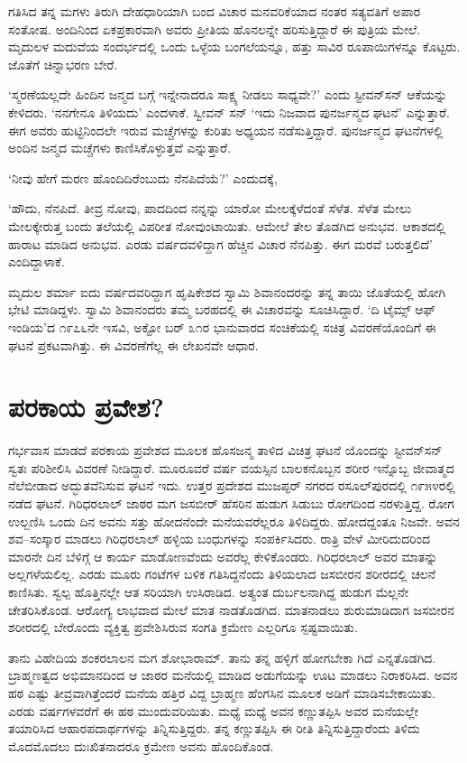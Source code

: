 ಗತಿಸಿದ ತನ್ನ ಮಗಳು ತಿರುಗಿ ದೇಹಧಾರಿಯಾಗಿ ಬಂದ ವಿಚಾರ ಮನವರಿಕೆಯಾದ ನಂತರ ಸತ್ಯವತಿಗೆ ಅಪಾರ ಸಂತೋಷ. ಅಂದಿನಿಂದ ಏಕಪ್ರಕಾರವಾಗಿ ಅವರು ಪ್ರೀತಿಯ ಹೊನಲನ್ನೇ ಹರಿಸುತ್ತಿದ್ದಾರೆ ಈ ಪುತ್ರಿಯ ಮೇಲೆ. ಮೃದುಲಳ ಮದುವೆಯ ಸಂದರ್ಭದಲ್ಲಿ ಒಂದು ಒಳ್ಳೆಯ ಬಂಗಲೆಯನ್ನೂ, ಹತ್ತು ಸಾವಿರ ರೂಪಾಯಿಗಳನ್ನೂ ಕೊಟ್ಟರು. ಜೊತೆಗೆ ಚಿನ್ನಾಭರಣ ಬೇರೆ.

‘ಸ್ಮರಣೆಯಲ್ಲದೇ ಹಿಂದಿನ ಜನ್ಮದ ಬಗ್ಗೆ ಇನ್ನೇನಾದರೂ ಸಾಕ್ಷ್ಯ ನೀಡಲು ಸಾಧ್ಯವೇ?’ ಎಂದು ಸ್ಟೀವನ್​ಸನ್ ಆಕೆಯನ್ನು ಕೇಳಿದರು. ‘ನನಗೇನೂ ತಿಳಿಯದು’ ಎಂದಳಾಕೆ. ಸ್ವೀವನ್ ಸನ್ ‘ಇದು ನಿಜವಾದ ಪುನರ್ಜನ್ಮದ ಘಟನೆ’ ಎನ್ನುತ್ತಾರೆ. ಈಗ ಅವರು ಹುಟ್ಟಿನಿಂದಲೇ ಇರುವ ಮಚ್ಚೆಗಳನ್ನು ಕುರಿತು ಅಧ್ಯಯನ ನಡೆಸುತ್ತಿದ್ದಾರೆ. ಪುನರ್ಜನ್ಮದ ಘಟನೆಗಳಲ್ಲಿ ಅಂದಿನ ಜನ್ಮದ ಮಚ್ಚೆಗಳು ಕಾಣಿಸಿಕೊಳ್ಳುತ್ತವೆ ಎನ್ನುತ್ತಾರೆ.

‘ನೀವು ಹೇಗೆ ಮರಣ ಹೊಂದಿದಿರೆಂಬುದು ನೆನಪಿದೆಯೆ?’ ಎಂದುದಕ್ಕೆ,

‘ಹೌದು, ನೆನಪಿದೆ. ತೀವ್ರ ನೋವು, ಪಾದದಿಂದ ನನ್ನನ್ನು ಯಾರೋ ಮೇಲಕ್ಕೆಳೆದಂತೆ ಸೆಳೆತ. ಸೆಳೆತ ಮೇಲು ಮೇಲಕ್ಕೇರುತ್ತ ಬಂದು ತಲೆಯಲ್ಲಿ ವಿಪರೀತ ನೋವುಂಟಾಯಿತು. ಆಮೇಲೆ ತೇಲ ತೊಡಗಿದ ಅನುಭವ. ಆಕಾಶದಲ್ಲಿ ಹಾರಾಟ ಮಾಡಿದ ಅನುಭವ. ಎರಡು ವರ್ಷದವಳಿದ್ದಾಗ ಹೆಚ್ಚಿನ ವಿಚಾರ ನೆನಪಿತ್ತು. ಈಗ ಮರವೆ ಬರುತ್ತಲಿದೆ’ ಎಂದಿದ್ದಾಳಾಕೆ.

ಮೃದುಲ ಶರ್ಮಾ ಐದು ವರ್ಷದವರಿದ್ದಾಗ ಹೃಷಿಕೇಶದ ಸ್ವಾಮಿ ಶಿವಾನಂದರನ್ನು ತನ್ನ ತಾಯಿ ಜೊತೆಯಲ್ಲಿ ಹೋಗಿ ಭೇಟಿ ಮಾಡಿದ್ದಳು. ಸ್ವಾಮಿ ಶಿವಾನಂದರು ತಮ್ಮ ಬರಹದಲ್ಲಿ ಈ ವಿಚಾರವನ್ನು ಸೂಚಿಸಿದ್ದಾರೆ. ‘ದಿ ಟೈಮ್ಸ್ ಆಫ್ ಇಂಡಿಯ’ದ ೧೯೭೬ನೇ ಇಸವಿ, ಅಕ್ಟೋ ಬರ್ ೩೧ರ ಭಾನುವಾರದ ಸಂಚಿಕೆಯಲ್ಲಿ ಸಚಿತ್ರ ವಿವರಣೆಯೊಂದಿಗೆ ಈ ಘಟನೆ ಪ್ರಕಟವಾಗಿತ್ತು. ಈ ವಿವರಣೆಗೆಲ್ಲ ಈ ಲೇಖನವೇ ಆಧಾರ.


\section{ಪರಕಾಯ ಪ್ರವೇಶ?}

ಗರ್ಭವಾಸ ಮಾಡದೆ ಪರಕಾಯ ಪ್ರವೇಶದ ಮೂಲಕ ಹೊಸಜನ್ಮ ತಾಳಿದ ವಿಚಿತ್ರ ಘಟನೆ ಯೊಂದನ್ನು ಸ್ಟೀವನ್​ಸನ್ ಸ್ವತಃ ಪರಿಶೀಲಿಸಿ ವಿವರಣೆ ನೀಡಿದ್ದಾರೆ. ಮೂರೂವರೆ ವರ್ಷ ವಯಸ್ಸಿನ ಬಾಲಕನೊಬ್ಬನ ಶರೀರ ಇನ್ನೊಬ್ಬ ಜೀವಾತ್ಮದ ನೆಲೆಬೀಡಾದ ಅದ್ಭುತವೆನಿಸುವ ಘಟನೆ ಇದು. ಉತ್ತರ ಪ್ರದೇಶದ ಮುಜಪ್ಫರ್ ನಗರದ ರಸೂಲ್​ಪುರದಲ್ಲಿ ೧೯೫೪ರಲ್ಲಿ ನಡೆದ ಘಟನೆ. ಗಿರಿಧರಲಾಲ್ ಜಾಠರ ಮಗ ಜಸಬೀರ್ ಹೆಸರಿನ ಹುಡುಗ ಸಿಡುಬು ರೋಗದಿಂದ ನರಳುತ್ತಿದ್ದ. ರೋಗ ಉಲ್ಬಣಿಸಿ ಒಂದು ದಿನ ಅವನು ಸತ್ತು ಹೋದನೆಂದೇ ಮನೆಯವರೆಲ್ಲರೂ ತಿಳಿದಿದ್ದರು. ಹೋದದ್ದಂತೂ ನಿಜವೇ. ಅವನ ಶವ–ಸಂಸ್ಕಾರ ಮಾಡಲು ಗಿರಿಧರಲಾಲ್ ಹಳ್ಳಿಯ ಬಂಧುಗಳನ್ನು ಸಂಪರ್ಕಿಸಿದರು. ರಾತ್ರಿ ವೇಳೆ ಮೀರಿದುದರಿಂದ ಮಾರನೇ ದಿನ ಬೆಳಿಗ್ಗೆ ಆ ಕಾರ್ಯ ಮಾಡೋಣವೆಂದು ಅವರೆಲ್ಲ ಕೇಳಿಕೊಂಡರು. ಗಿರಿಧರಲಾಲ್ ಅವರ ಮಾತನ್ನು ಅಲ್ಲಗಳೆಯಲಿಲ್ಲ. ಎರಡು ಮೂರು ಗಂಟೆಗಳ ಬಳಿಕ ಗತಿಸಿದ್ದನೆಂದು ತಿಳಿಯಲಾದ ಜಸಬೀರನ ಶರೀರದಲ್ಲಿ ಚಲನೆ ಕಾಣಿಸಿತು. ಸ್ವಲ್ಪ ಹೊತ್ತಿನಲ್ಲೇ ಆತ ಸರಿಯಾಗಿ ಉಸಿರಾಡಿದ. ಅತ್ಯಂತ ದುರ್ಬಲನಾಗಿದ್ದ ಹುಡುಗ ಮೆಲ್ಲನೇ ಚೇತರಿಸಿಕೊಂಡ. ಆರೋಗ್ಯ ಲಾಭವಾದ ಮೇಲೆ ಮಾತ ನಾಡತೊಡಗಿದ. ಮಾತನಾಡಲು ಶುರುಮಾಡಿದಾಗ ಜಸಬೀರನ ಶರೀರದಲ್ಲಿ ಬೇರೊಂದು ವ್ಯಕ್ತಿತ್ವ ಪ್ರವೇಶಿಸಿರುವ ಸಂಗತಿ ಕ್ರಮೇಣ ಎಲ್ಲರಿಗೂ ಸ್ಪಷ್ಟವಾಯಿತು.

ತಾನು ವಿಹೇದಿಯ ಶಂಕರಲಾಲನ ಮಗ ಶೋಭಾರಾಮ್. ತಾನು ತನ್ನ ಹಳ್ಳಿಗೆ ಹೋಗಬೇಕಾ ಗಿದೆ ಎನ್ನತೊಡಗಿದ. ಬ್ರಾಹ್ಮಣತ್ವದ ಅಭಿಮಾನದಿಂದ ಆ ಜಾಠರ ಮನೆಯಲ್ಲಿ ಮಾಡಿದ ಅಡುಗೆಯನ್ನು ಊಟ ಮಾಡಲು ನಿರಾಕರಿಸಿದ. ಅವನ ಹಠ ಎಷ್ಟು ತೀವ್ರವಾಗಿತ್ತೆಂದರೆ ಮನೆಯ ಹತ್ತಿರ ವಿದ್ದ ಬ್ರಾಹ್ಮಣ ಹೆಂಗಸಿನ ಮೂಲಕ ಅಡಿಗೆ ಮಾಡಿಸಬೇಕಾಯಿತು. ಎರಡು ವರ್ಷಗಳವರೆಗೆ ಈ ಹಠ ಮುಂದುವರಿಯಿತು. ಮಧ್ಯೆ ಮಧ್ಯೆ ಅವನ ಕಣ್ಣುತಪ್ಪಿಸಿ ಅವರ ಮನೆಯಲ್ಲೇ ತಯಾರಿಸಿದ ಆಹಾರಪದಾರ್ಥಗಳನ್ನು ತಿನ್ನಿಸುತ್ತಿದ್ದರು. ತನ್ನ ಕಣ್ಣುತಪ್ಪಿಸಿ ಈ ರೀತಿ ತಿನ್ನಿಸುತ್ತಿದ್ದಾರೆಂದು ತಿಳಿದು ಮೊದಮೊದಲು ದುಃಖಿತನಾದರೂ ಕ್ರಮೇಣ ಅವನು ಹೊಂದಿಕೊಂಡ.

